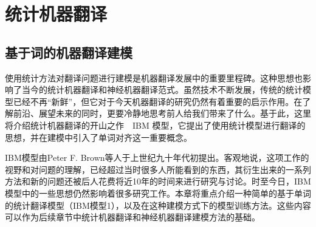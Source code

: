 
%


\part{统计机器翻译}
\renewcommand\figurename{图}%
\renewcommand\tablename{表}%


\chapter{基于词的机器翻译建模}

\parinterval 使用统计方法对翻译问题进行建模是机器翻译发展中的重要里程碑。这种思想也影响了当今的统计机器翻译和神经机器翻译范式。虽然技术不断发展，传统的统计模型已经不再“新鲜”，但它对于今天机器翻译的研究仍然有着重要的启示作用。在了解前沿、展望未来的同时，更要冷静地思考前人给我们带来了什么。基于此，这里将介绍统计机器翻译的开山之作\ \dash \ IBM 模型，它提出了使用统计模型进行翻译的思想，并在建模中引入了单词对齐这一重要概念。

IBM模型由Peter F. Brown等人于上世纪九十年代初提出。客观地说，这项工作的视野和对问题的理解，已经超过当时很多人所能看到的东西，其衍生出来的一系列方法和新的问题还被后人花费将近10年的时间来进行研究与讨论。时至今日，IBM模型中的一些思想仍然影响着很多研究工作。本章将重点介绍一种简单的基于单词的统计翻译模型（IBM模型1），以及在这种建模方式下的模型训练方法。这些内容可以作为后续章节中统计机器翻译和神经机器翻译建模方法的基础。



